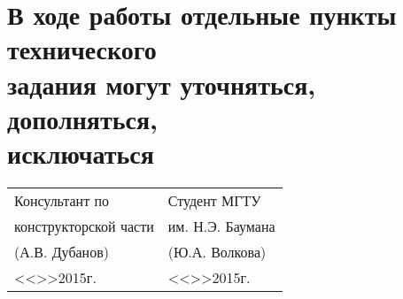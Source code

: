 \documentclass[12pt,a4paper,oneside]{extarticle}
\begin{document}
\section{В ходе работы отдельные пункты технического\\задания могут уточняться, дополняться,\\исключаться}

\bigskip

\begin{tabular}{ll}
    Консультант по                                                  &   Студент МГТУ \\
    конструкторской части                                           &   им. Н.Э. Баумана \\
    \underline{\hspace{3cm}}(А.В. Дубанов)                          & \underline{\hspace{3cm}}(Ю.А. Волкова) \\
    <<\underline{\hspace{0.5cm}}>>\underline{\hspace{3cm}}2015г.    & <<\underline{\hspace{0.5cm}}>>\underline{\hspace{3cm}}2015г. \\
\end{tabular}
\end{document}
